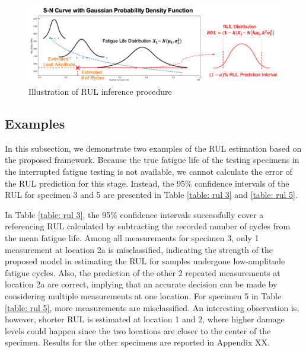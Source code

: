 \begin{figure}[tb]
    \includegraphics[width=\linewidth]{fig/rul_inference_procedure.png}
    \caption{Illustration of RUL inference procedure}
    \label{fig: rul infer procedure}
\end{figure}

\subsection{Examples}
In this subsection, we demonstrate two examples of the RUL estimation based on the proposed framework. Because the true fatigue life of the testing specimens in the interrupted fatigue testing is not available, we cannot calculate the error of the RUL prediction for this stage. Instead, the 95\% confidence intervals of the RUL for specimen 3 and 5 are presented in Table \ref{table: rul 3} and \ref{table: rul 5}. 

In Table \ref{table: rul 3}, the 95\% confidence intervals successfully cover a referencing RUL calculated by subtracting the recorded number of cycles from the mean fatigue life. Among all measurements for specimen 3, only 1 measurement at location 2a is misclassified, indicating the strength of the proposed model in estimating the RUL for samples undergone low-amplitude fatigue cycles. Also, the prediction of the other 2 repeated measurements at location 2a are correct, implying that an accurate decision can be made by considering multiple measurements at one location. For specimen 5 in Table \ref{table: rul 5}, more measurements are misclassified. An interesting observation is, however, shorter RUL is estimated at location 1 and 2, where higher damage levels could happen since the two locations are closer to the center of the specimen. Results for the other specimens are reported in Appendix XX.

